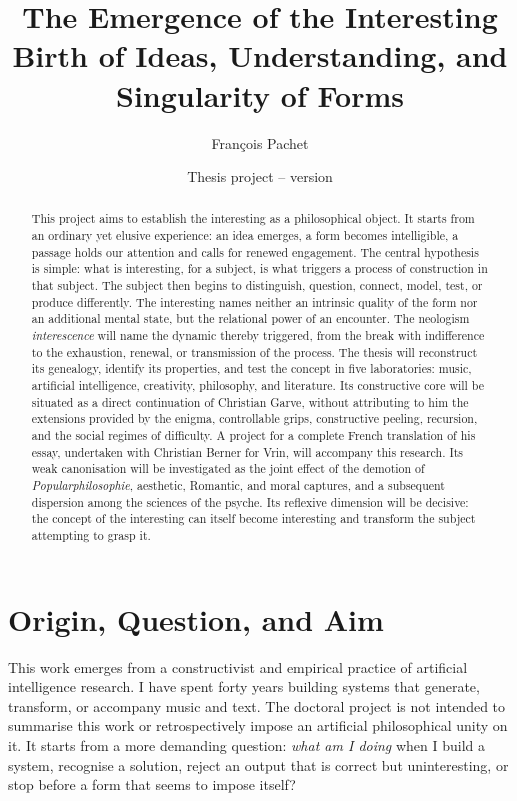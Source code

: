 \documentclass[11pt,a4paper]{article}
\title{The Emergence of the Interesting\\
\large Birth of Ideas, Understanding, and Singularity of Forms}
\author{François Pachet}
\date{Thesis project -- version \projectversion\\\small \projectdate}
\begin{document}
\maketitle

\begin{abstract}
This project aims to establish the interesting as a philosophical object. It
starts from an ordinary yet elusive experience: an idea emerges, a form becomes
intelligible, a passage holds our attention and calls for renewed engagement.
The central hypothesis is simple: what is interesting, for a subject, is what
triggers a process of construction in that subject. The subject then begins to
distinguish, question, connect, model, test, or produce differently. The
interesting names neither an intrinsic quality of the form nor an additional
mental state, but the relational power of an encounter. The neologism
\emph{interescence} will name the dynamic thereby triggered, from the break with
indifference to the exhaustion, renewal, or transmission of the process. The
thesis will reconstruct
its genealogy, identify its properties, and test the concept in five
laboratories: music, artificial intelligence, creativity, philosophy, and
literature. Its constructive core will be situated as a direct continuation of
Christian Garve, without attributing to him the extensions provided by the
enigma, controllable grips, constructive peeling, recursion, and the social
regimes of difficulty. A project for a complete French translation of
his essay, undertaken with Christian Berner for Vrin, will accompany this
research. Its weak canonisation will be investigated as the joint
effect of the demotion of \emph{Popularphilosophie}, aesthetic, Romantic, and
moral captures, and a subsequent dispersion among the sciences of the psyche.
Its reflexive dimension will be decisive: the concept of the interesting can
itself become interesting and transform the subject attempting to grasp it.
\end{abstract}

\section{Origin, Question, and Aim}

This work emerges from a constructivist and empirical practice of artificial
intelligence research. I have spent forty years building systems that generate,
transform, or accompany music and text. The doctoral project is not intended to
summarise this work or retrospectively impose an artificial philosophical unity
on it. It starts from a more demanding question: \emph{what am I doing} when I
build a system, recognise a solution, reject an output that is correct but
uninteresting, or stop before a form that seems to impose itself?
\end{document}
